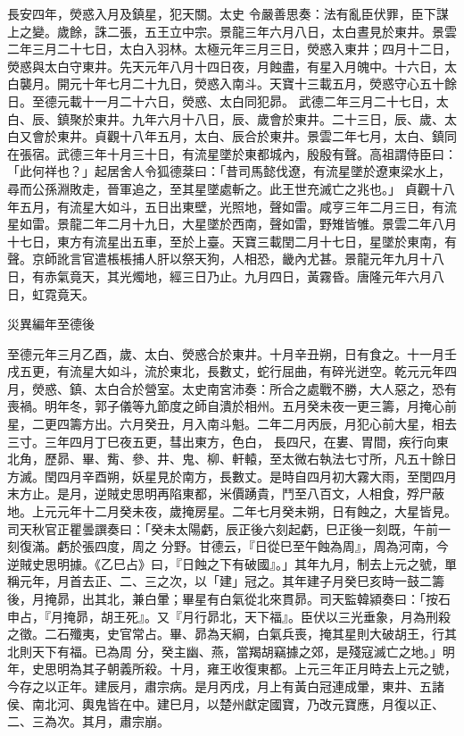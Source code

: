 \begin{pinyinscope}
 長安四年，熒惑入月及鎮星，犯天關。太史
 令嚴善思奏：法有亂臣伏罪，臣下謀上之變。歲餘，誅二張，五王立中宗。景龍三年六月八日，太白晝見於東井。景雲二年三月二十七日，太白入羽林。太極元年三月三日，熒惑入東井；四月十二日，熒惑與太白守東井。先天元年八月十四日夜，月蝕盡，有星入月魄中。十六日，太白襲月。開元十年七月二十九日，熒惑入南斗。天寶十三載五月，熒惑守心五十餘日。至德元載十一月二十六日，熒惑、太白同犯昴。
 武德二年三月二十七日，太白、辰、鎮聚於東井。九年六月十八日，辰、歲會於東井。二十三日，辰、歲、太白又會於東井。貞觀十八年五月，太白、辰合於東井。景雲二年七月，太白、鎮同在張宿。武德三年十月三十日，有流星墜於東都城內，殷殷有聲。高祖謂侍臣曰：「此何祥也？」起居舍人令狐德棻曰：「昔司馬懿伐遼，有流星墜於遼東梁水上，尋而公孫淵敗走，晉軍追之，至其星墜處斬之。此王世充滅亡之兆也。」
 貞觀十八年五月，有流星大如斗，五日出東壁，光照地，聲如雷。咸亨三年二月三日，有流星如雷。景龍二年二月十九日，大星墜於西南，聲如雷，野雉皆雊。景雲二年八月十七日，東方有流星出五車，至於上臺。天寶三載閏二月十七日，星墜於東南，有聲。京師訛言官遣棖棖捕人肝以祭天狗，人相恐，畿內尤甚。景龍元年九月十八日，有赤氣竟天，其光燭地，經三日乃止。九月四日，黃霧昏。唐隆元年六月八日，虹霓竟天。



 災異編年至德後



 至德元年三月乙酉，歲、太白、熒惑合於東井。十月辛丑朔，日有食之。十一月壬戌五更，有流星大如斗，流於東北，長數丈，蛇行屈曲，有碎光迸空。乾元元年四月，熒惑、鎮、太白合於營室。太史南宮沛奏：所合之處戰不勝，大人惡之，恐有喪禍。明年冬，郭子儀等九節度之師自潰於相州。五月癸未夜一更三籌，月掩心前星，二更四籌方出。六月癸丑，月入南斗魁。二年二月丙辰，月犯心前大星，相去三寸。三年四月丁巳夜五更，彗出東方，色白，
 長四尺，在婁、胃間，疾行向東北角，歷昴、畢、觜、參、井、鬼、柳、軒轅，至太微右執法七寸所，凡五十餘日方滅。閏四月辛酉朔，妖星見於南方，長數丈。是時自四月初大霧大雨，至閏四月末方止。是月，逆賊史思明再陷東都，米價踴貴，鬥至八百文，人相食，殍尸蔽地。上元元年十二月癸未夜，歲掩房星。二年七月癸未朔，日有蝕之，大星皆見。司天秋官正瞿曇譔奏曰：「癸未太陽虧，辰正後六刻起虧，巳正後一刻既，午前一刻復滿。虧於張四度，周之
 分野。甘德云，『日從巳至午蝕為周』，周為河南，今逆賊史思明據。《乙巳占》曰，『日蝕之下有破國』。」其年九月，制去上元之號，單稱元年，月首去正、二、三之次，以「建」冠之。其年建子月癸巳亥時一鼓二籌後，月掩昴，出其北，兼白暈；畢星有白氣從北來貫昴。司天監韓潁奏曰：「按石申占，『月掩昴，胡王死』。又『月行昴北，天下福』。臣伏以三光垂象，月為刑殺之徵。二石殲夷，史官常占。畢、昴為天綱，白氣兵喪，掩其星則大破胡王，行其北則天下有福。已為周
 分，癸主幽、燕，當羯胡竊據之郊，是殘寇滅亡之地。」明年，史思明為其子朝義所殺。十月，雍王收復東都。上元三年正月時去上元之號，今存之以正年。建辰月，肅宗病。是月丙戌，月上有黃白冠連成暈，東井、五諸侯、南北河、輿鬼皆在中。建巳月，以楚州獻定國寶，乃改元寶應，月復以正、二、三為次。其月，肅宗崩。




\end{pinyinscope}
